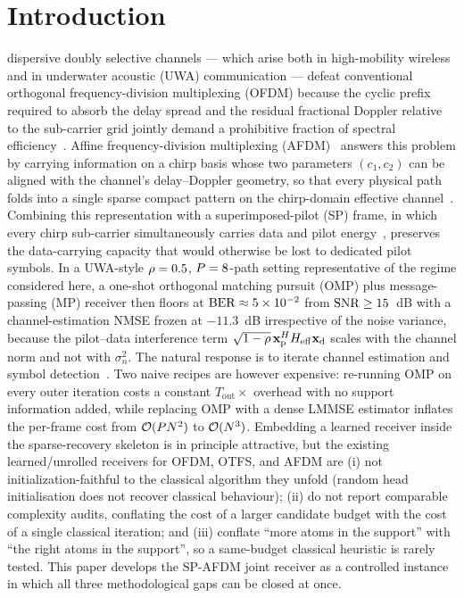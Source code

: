 \section{Introduction}
\label{sec:intro}

 dispersive doubly selective channels --- which arise
both in high-mobility wireless and in underwater acoustic (UWA)
communication --- defeat conventional orthogonal frequency-division
multiplexing (OFDM) because the cyclic prefix required to absorb the
delay spread and the residual fractional Doppler relative to the
sub-carrier grid jointly demand a prohibitive fraction of spectral
efficiency~\cite{stojanovic2009uwa,preisig2007uwa,berger2010uwasparse,huang2010uwamimoofdm}.
Affine frequency-division multiplexing (AFDM)~\cite{bemani2023afdm} answers
this problem by carrying information on a chirp basis whose two parameters
$(c_1,c_2)$ can be aligned with the channel's delay--Doppler geometry, so
that every physical path folds into a single sparse compact pattern on the
chirp-domain effective channel~\cite{benzine2023sparseafdm,rou2024otfstoafdm,yin2025afdmoverview}.
Combining this representation with a superimposed-pilot (SP) frame, in
which every chirp sub-carrier simultaneously carries data and pilot
energy~\cite{cui2007superimposed,tugnait2006superimposed,orozco2011superimposed},
preserves the data-carrying capacity that would otherwise be lost to
dedicated pilot symbols. In a UWA-style $\rho=0.5$, $P=8$-path setting
representative of the regime considered here, a one-shot orthogonal
matching pursuit (OMP) plus message-passing (MP) receiver then floors at
$\mathrm{BER}\approx 5\times 10^{-2}$ from $\mathrm{SNR}\geq 15$~dB with a channel-estimation
NMSE frozen at $-11.3$~dB irrespective of the noise variance, because the
pilot--data interference term $\sqrt{1-\rho}\,\mathbf{x}_{\mathrm{p}}^HH_{\mathrm{eff}}\mathbf{x}_{\mathrm{d}}$ scales with the
channel norm and not with $\sigma_n^2$.
The natural response is to iterate channel estimation and symbol
detection~\cite{wymeersch2007iterativereceiver,qing2024spafdm,zhao2024gifreeafdm}.
Two naive recipes are however expensive: re-running OMP on every outer
iteration costs a constant $T_\text{out}\times$ overhead with no support
information added, while replacing OMP with a dense LMMSE estimator
inflates the per-frame cost from $\mathcal{O}(PN^2)$ to
$\mathcal{O}(N^3)$. Embedding a learned receiver inside the
sparse-recovery skeleton is in principle attractive, but the existing
learned/unrolled receivers for OFDM, OTFS, and AFDM
\cite{he2020modeldrivenmimo,shlezinger2021deepsic,khani2020mmnet,xu2024detecttolearn,samuel2019detnet,afdm2025jointcesd}
are (i) not initialization-faithful to the classical algorithm they
unfold (random head initialisation does not recover classical behaviour);
(ii) do not report comparable complexity audits, conflating the cost of a
larger candidate budget with the cost of a single
classical iteration; and (iii) conflate ``more atoms in the support'' with
``the right atoms in the support'', so a same-budget classical heuristic
is rarely tested. This paper develops the SP-AFDM joint receiver as a
controlled instance in which all three methodological gaps can be closed
at once.

